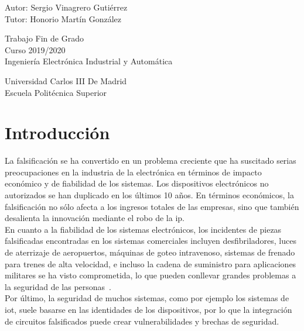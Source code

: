 \documentclass[spanish]{template/minim}
\newcommand{\blankpage}{
    \null\thispagestyle{empty}\addtocounter{page}{-1}\newpage%
}
\begin{document}
\begin{titlepage}
    {\fontsize{15}{12}\selectfont Autor: Sergio Vinagrero Gutiérrez\\[3mm]Tutor: Honorio Martín González}

    \vspace*{3cm}
    \begin{fullwidth}
        {\fontsize{15}{12}\selectfont
            Trabajo Fin de Grado\\[2mm]
            Curso 2019/2020\\[2mm]
            Ingeniería Electrónica Industrial y Automática}

        \vspace*{1cm}

        {\fontsize{15}{12}\selectfont
        Universidad Carlos III De Madrid\\[2mm]
        Escuela Politécnica Superior}
    \vspace*{2cm}
    {
        \hypersetup{linkcolor=black}
        \hypersetup{hidelinks}
        \doclicenseThis{}
    }
    \end{fullwidth}

\end{titlepage}
\restoregeometry{}

\blankpage{}

\cleardoublepage{}

{
  \hypersetup{linkcolor=black}
  \hypersetup{hidelinks}
  \tableofcontents
  \listoffigures
  \listoftables
}


\cleardoublepage{}


\section{Introducción}\label{sec:introduction}

La falsificación se ha convertido en un problema creciente que ha suscitado serias preocupaciones en la industria de la electrónica en términos de impacto económico y de fiabilidad de los sistemas. Los dispositivos electrónicos no autorizados se han duplicado en los últimos 10 años. En términos económicos, la falsificación no sólo afecta a los ingresos totales de las empresas, sino que también desalienta la innovación mediante el robo de la \gls{ip}.\\

En cuanto a la fiabilidad de los sistemas electrónicos, los incidentes de piezas falsificadas encontradas en los sistemas comerciales incluyen desfibriladores, luces de aterrizaje de aeropuertos, máquinas de goteo intravenoso, sistemas de frenado para trenes de alta velocidad, e incluso la cadena de suministro para aplicaciones militares se ha visto comprometida, lo que pueden conllevar grandes problemas a la seguridad de las personas~.\\ Por último, la seguridad de muchos sistemas, como por ejemplo los sistemas de \gls{iot}, suele basarse en las identidades de los dispositivos, por lo que la integración de circuitos falsificados puede crear vulnerabilidades y brechas de seguridad.\\
\end{document}
